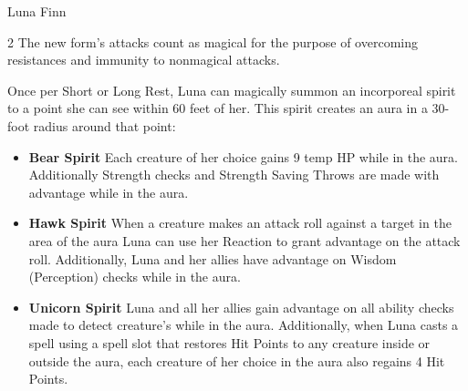 \begin{DndMonster}[width=\textwidth + 8pt]{Luna Finn}
\begin{multicols}{2}
		The new form's attacks count as magical for the purpose of overcoming resistances and immunity to nonmagical attacks.
		
		Once per Short or Long Rest, Luna can magically summon an incorporeal spirit to a point she can see within 60 feet of her. This spirit creates an aura in a 30-foot radius around that point:
		\begin{itemize}
			\item \textbf{Bear Spirit} Each creature of her choice gains 9 temp HP while in the aura. Additionally Strength checks and Strength Saving Throws are made with advantage while in the aura.
			\item \textbf{Hawk Spirit} When a creature makes an attack roll against a target in the area of the aura Luna can use her Reaction to grant advantage on the attack roll. Additionally, Luna and her allies have advantage on Wisdom (Perception) checks while in the aura.
			\item \textbf{Unicorn Spirit} Luna and all her allies gain advantage on all ability checks made to detect creature's while in the aura. Additionally, when Luna casts a spell using a spell slot that restores Hit Points to any creature inside or outside the aura, each creature of her choice in the aura also regains 4 Hit Points.
		\end{itemize}
	\end{multicols}
\end{DndMonster}